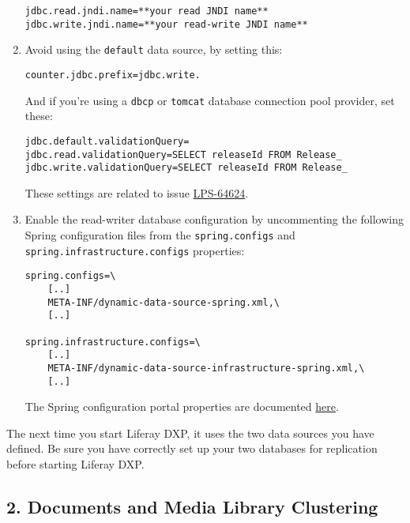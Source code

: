 \begin{enumerate}
\begin{verbatim}
jdbc.read.jndi.name=**your read JNDI name**
jdbc.write.jndi.name=**your read-write JNDI name**
\end{verbatim}
\item
  Avoid using the \texttt{default} data source, by setting this:

\begin{verbatim}
counter.jdbc.prefix=jdbc.write.
\end{verbatim}

  And if you're using a \texttt{dbcp} or \texttt{tomcat} database
  connection pool provider, set these:

\begin{verbatim}
jdbc.default.validationQuery=
jdbc.read.validationQuery=SELECT releaseId FROM Release_
jdbc.write.validationQuery=SELECT releaseId FROM Release_
\end{verbatim}

  These settings are related to issue
  \href{https://issues.liferay.com/browse/LPS-64624}{LPS-64624}.
\item
  Enable the read-writer database configuration by uncommenting the
  following Spring configuration files from the \texttt{spring.configs}
  and \texttt{spring.infrastructure.configs} properties:

\begin{verbatim}
spring.configs=\
    [..]
    META-INF/dynamic-data-source-spring.xml,\
    [..]

spring.infrastructure.configs=\
    [..]
    META-INF/dynamic-data-source-infrastructure-spring.xml,\
    [..]
\end{verbatim}

  The Spring configuration portal properties are documented
  \href{@platform-ref@/7.0-latest/propertiesdoc/portal.properties.html\#Spring}{here}.
\end{enumerate}

The next time you start Liferay DXP, it uses the two data sources you
have defined. Be sure you have correctly set up your two databases for
replication before starting Liferay DXP.

\subsection{2. Documents and Media Library
Clustering}\label{documents-and-media-library-clustering}

